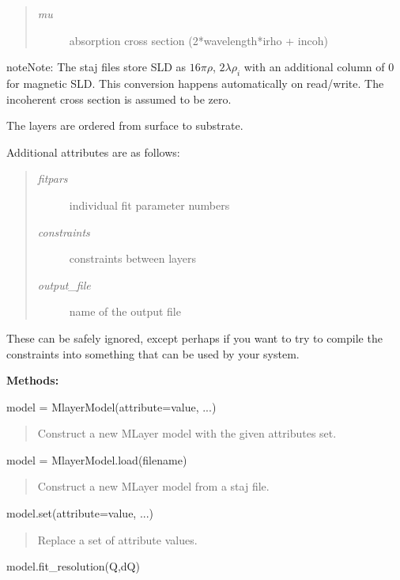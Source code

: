 \documentclass[letterpaper,10pt,english]{sphinxmanual}
\begin{document}
\begin{fulllineitems}
\begin{quote}
\begin{description}
\item[{\emph{mu}}] \leavevmode
absorption cross section (2*wavelength*irho + incoh)

\end{description}
\end{quote}

\begin{notice}{note}{Note:}
The staj files store SLD as $16\pi\rho$, $2\lambda\rho_i$
with an additional column of 0 for magnetic SLD. This conversion
happens automatically on read/write. The incoherent cross section
is assumed to be zero.
\end{notice}

The layers are ordered from surface to substrate.

Additional attributes are as follows:
\begin{quote}
\begin{description}
\item[{\emph{fitpars}}] \leavevmode
individual fit parameter numbers

\item[{\emph{constraints}}] \leavevmode
constraints between layers

\item[{\emph{output\_file}}] \leavevmode
name of the output file

\end{description}
\end{quote}

These can be safely ignored, except perhaps if you want to try to
compile the constraints into something that can be used by your system.

\textbf{Methods:}

model = MlayerModel(attribute=value, ...)
\begin{quote}

Construct a new MLayer model with the given attributes set.
\end{quote}

model = MlayerModel.load(filename)
\begin{quote}

Construct a new MLayer model from a staj file.
\end{quote}

model.set(attribute=value, ...)
\begin{quote}

Replace a set of attribute values.
\end{quote}

model.fit\_resolution(Q,dQ)
\begin{quote}


\end{quote}
\end{fulllineitems}
\end{document}

